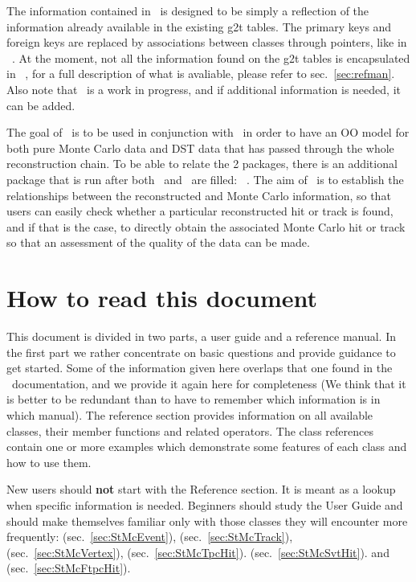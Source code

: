 The information contained in \StMcEvent\ is designed to be simply
a reflection of the information already available in the existing
g2t tables.  The primary keys and foreign keys are replaced by
associations between classes through pointers, like in \StEvent\ .
At the moment, not all the information found on the g2t tables is
encapsulated in \StMcEvent\ , for a full description of what is
avaliable, please refer to sec.~\ref{sec:refman}.  Also note that
\StMcEvent\ is a work in progress, and if additional information
is needed, it can be added.

The goal of \StMcEvent\ is to be used in conjunction with \StEvent\ in
order to have an OO model for both pure Monte Carlo data and DST data
that has passed through the whole reconstruction chain.  To be able
to relate the 2 packages, there is an additional package that is
run after both \StEvent\ and \StMcEvent\ are filled: \StAssociationMaker\ .
The aim of \StAssociationMaker\ is to establish the relationships
between the reconstructed and Monte Carlo information, so that
users can easily check whether a particular reconstructed hit or
track is found, and if that is the case,
to directly obtain the associated Monte
Carlo hit or track so that an assessment of the quality of the
data can be made.

\clearpage


\section{How to read this document}

This document is divided in two parts, a user guide and a
reference manual. In the first part we rather concentrate on basic
questions and provide guidance to get started.  Some of the information
given here overlaps that one found in the \StEvent\ documentation,
and we provide it again here for completeness (We think that it is better
to be redundant than to have to remember which information is in which
manual).  The reference section
provides information on all available classes, their member functions
and related operators. The class references contain one or more
examples which demonstrate some features of each class and how to use
them.

New users should \textbf{not} start with the Reference section. It is
meant as a lookup when specific information is needed. Beginners
should study the User Guide and should make themselves familiar only
with those classes they will encounter more frequently:
  (sec.~\ref{sec:StMcEvent}),
  (sec.~\ref{sec:StMcTrack}),
 (sec.~\ref{sec:StMcVertex}),
 (sec.~\ref{sec:StMcTpcHit}).
 (sec.~\ref{sec:StMcSvtHit}).
and  (sec.~\ref{sec:StMcFtpcHit}).



